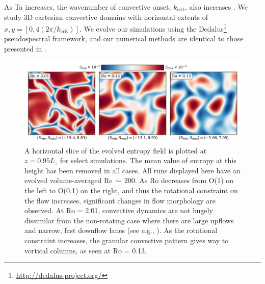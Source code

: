 \documentclass[twocolumn, amsmath, amsfonts, amssymb]{aastex62}
\begin{document}
As Ta increases, the wavenumber of convective onset, $k_{\text{crit}}$, also increases
\citep{calkins&all2015a}. 
We study 3D cartesian convective domains with horizontal extents of
$x, y = [0, 4(2\pi/k_{\text{crit}})]$. 
We evolve our simulations using the Dedalus\footnote{\url{http://dedalus-project.org/}} 
pseudospectral framework, and our numerical methods are identical to those presented
in \AB.

\begin{figure}[t]
    \includegraphics[width=\textwidth]{dynamics_plot.png}
    \caption{ A horizontal slice of the evolved entropy field is plotted at $z = 0.95L_z$
    for select simulations. The mean value of entropy at this height has been removed in all
    cases. All runs displayed here have an evolved volume-averaged Re$\,\sim\,200$. 
    As Ro decreases from O(1) on the left to O(0.1) on the right, and thus the rotational
    constraint on the flow increases, significant changes in flow morphology are observed.
    At Ro = 2.01, convective dynamics are not hugely dissimilar from the non-rotating
    case where there are large upflows and narrow, fast downflow lanes (see e.g., \AB).
    As the rotational constraint increases, the granular convective pattern gives way
    to vortical columns, as seen at Ro = 0.13.
    \label{fig:pretty_convection} }
\end{figure}
\end{document}
